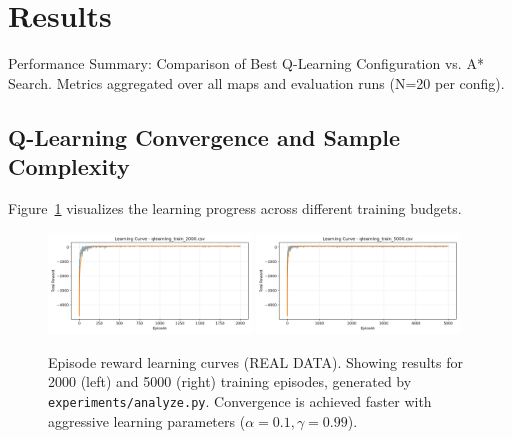 \documentclass[conference]{IEEEtran}
\begin{document}
	\FloatBarrier
	
	\section{Results}
	
	\begin{table}[t]
		\caption{Performance Summary: Comparison of Best Q-Learning Configuration vs. A* Search. Metrics aggregated over all maps and evaluation runs (N=20 per config).}
		\label{tab:summary}
		\centering
		 
	\end{table}
	
	\subsection{Q-Learning Convergence and Sample Complexity}
	Figure~\ref{fig:learning} visualizes the learning progress across different training budgets.
	
	\begin{figure}[ht]
		\centering
		\includegraphics[width=0.48\textwidth]{../results/plots/learning_curve_qlearning_train_2000.png}%
		\hfill
		\includegraphics[width=0.48\textwidth]{../results/plots/learning_curve_qlearning_train_5000.png}
		\caption{Episode reward learning curves (REAL DATA). Showing results for 2000 (left) and 5000 (right) training episodes, generated by \texttt{experiments/analyze.py}. Convergence is achieved faster with aggressive learning parameters ($\alpha=0.1, \gamma=0.99$).}
		\label{fig:learning}
	\end{figure}
	
\end{document}
